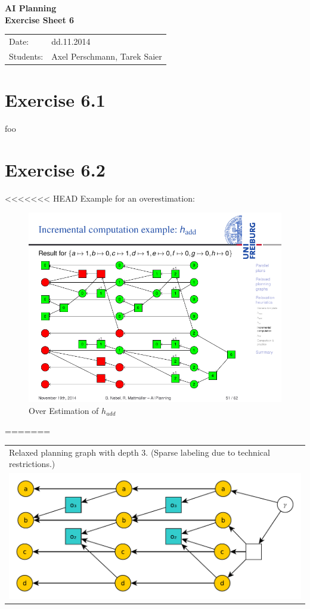 \documentclass[11pt,a4paper]{article}
\begin{document}
\begin{center}
\Huge{\textbf{AI Planning}}\\
\LARGE{\textbf{Exercise Sheet 6}}
\end{center}
\vspace{2cm}
\begin{tabular}{ll}
Date: & dd.11.2014\\
Students: & Axel Perschmann, Tarek Saier
\end{tabular}

\section*{Exercise 6.1}
foo

\section*{Exercise 6.2}
<<<<<<< HEAD
Example for an overestimation:
\begin{figure}[h!]
\centering
\caption{Over Estimation of $h_{add}$}
\includegraphics[scale=1]{aip08-handout51}
\end{figure}
=======
\begin{tabular}{l} %
Relaxed planning graph with depth 3. (Sparse labeling due to technical restrictions.)\\
\includegraphics[scale=0.5]{g62}\\
\end{tabular}
\end{document}
